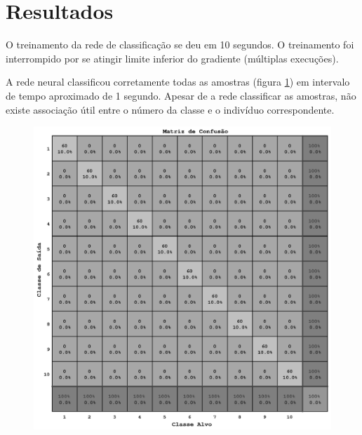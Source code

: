 
\section{Resultados}

O treinamento da rede de classificação se deu em 10 segundos. O treinamento foi
interrompido por se atingir limite inferior do gradiente (múltiplas execuções).

A rede neural classificou corretamente todas as amostras (figura
\ref{Figure-031-ConfusionMatrix}) em intervalo de tempo aproximado de 1 segundo.
Apesar de a rede classificar as amostras, não existe associação útil entre o
número da classe e o indivíduo correspondente.

\begin{figure}
  \centering
  \captionsetup{type=figure}
  \hspace*{-12cm}
  \includegraphics[scale=0.75]{./figures/Figure-031-ConfusionMatrix.eps}
	\label{Figure-031-ConfusionMatrix}
\end{figure}

